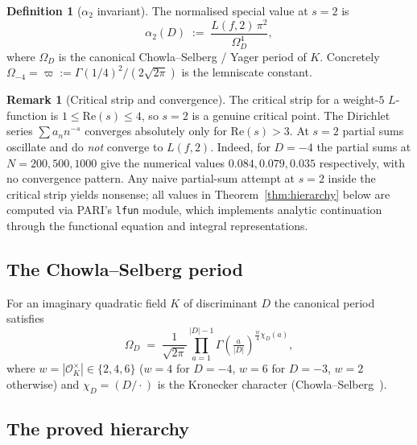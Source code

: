 \documentclass[12pt]{amsart}
\theoremstyle{definition}
\newtheorem{definition}[theorem]{Definition}
\newtheorem{remark}[theorem]{Remark}
\newcommand{\OK}{\mathcal{O}_K}
\begin{document}
\begin{definition}[$\alpha_2$ invariant]\label{def:alpha2}
The normalised special value at $s=2$ is
\begin{equation}\label{eq:alpha2def}
  \alpha_2(D) \;:=\; \frac{L(f, 2)\,\pi^2}{\Omega_D^4},
\end{equation}
where $\Omega_D$ is the canonical Chowla--Selberg / Yager period of $K$.
Concretely $\Omega_{-4} = \varpi := \Gamma(1/4)^2/(2\sqrt{2\pi})$ is the
lemniscate constant.
\end{definition}

\begin{remark}[Critical strip and convergence]\label{rmk:strip}
The critical strip for a weight-$5$ $L$-function is
$1 \leq \mathrm{Re}(s) \leq 4$, so $s = 2$ is a genuine critical
point. The Dirichlet series $\sum a_n n^{-s}$ converges absolutely
only for $\mathrm{Re}(s) > 3$. At $s = 2$ partial sums oscillate and
do \emph{not} converge to $L(f,2)$. Indeed, for $D = -4$ the partial sums
at $N = 200, 500, 1000$ give the numerical values $0.084, 0.079, 0.035$
respectively, with no convergence pattern. Any naive partial-sum
attempt at $s=2$ inside the critical strip yields nonsense; all values
in Theorem~\ref{thm:hierarchy} below are computed via PARI's
\texttt{lfun} module, which implements analytic continuation through
the functional equation and integral representations.
\end{remark}

\subsection{The Chowla--Selberg period}

For an imaginary quadratic field $K$ of discriminant $D$ the canonical
period satisfies
\begin{equation}\label{eq:CS}
  \Omega_D \;=\; \frac{1}{\sqrt{2\pi}} \prod_{a=1}^{|D|-1}
    \Gamma\!\left(\tfrac{a}{|D|}\right)^{\frac{w}{4}\chi_D(a)},
\end{equation}
where $w = |\OK^\times| \in \{2,4,6\}$ ($w=4$ for $D=-4$, $w=6$ for
$D=-3$, $w=2$ otherwise) and $\chi_D = (D/\cdot)$ is the Kronecker
character (Chowla--Selberg~\cite{ChowlaSelberg1949}).

\subsection{The proved hierarchy}
\label{ssec:proved-hierarchy}
\end{document}

